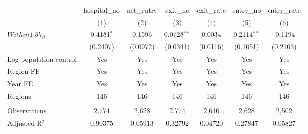 \begingroup
\centering
\begin{tabular}{lcccccc}
   \toprule
                          & hospital\_no  & net\_entry  & exit\_no      & exit\_rate  & entry\_no     & entry\_rate \\    
                          & (1)           & (2)         & (3)           & (4)         & (5)           & (6)\\  
   \midrule 
   $Within1.5h_{it}$      & 0.4181$^{*}$  & 0.1596      & 0.0728$^{**}$ & 0.0034      & 0.2114$^{**}$ & -0.1194\\   
                          & (0.2407)      & (0.0972)    & (0.0341)      & (0.0116)    & (0.1051)      & (0.2103)\\   
   Log population control & Yes           & Yes         & Yes           & Yes         & Yes           & Yes\\  
   Region FE              & Yes           & Yes         & Yes           & Yes         & Yes           & Yes\\  
   Year FE                & Yes           & Yes         & Yes           & Yes         & Yes           & Yes\\  
   Regions                & 146           & 146         & 146           & 146         & 146           & 146\\  
    \\
   Observations           & 2,774         & 2,628       & 2,774         & 2,640       & 2,628         & 2,502\\  
   Adjusted R$^2$         & 0.90375       & 0.05913     & 0.32792       & 0.04720     & 0.27847       & 0.05827\\  
   \bottomrule
\end{tabular}
\par\endgroup
